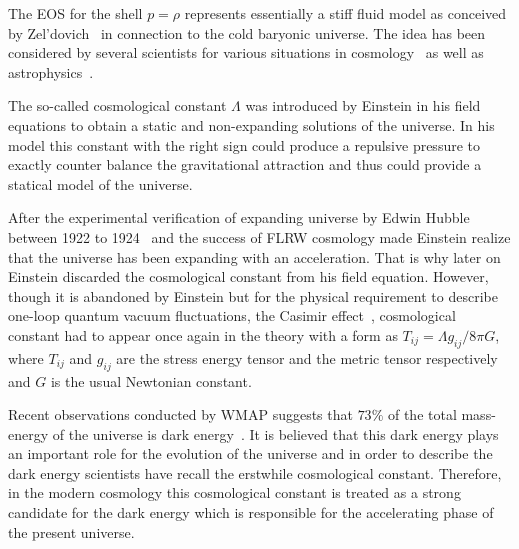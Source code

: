 \documentclass[preprint,12pt]{elsarticle}
\begin{document}
The EOS for the shell $p=\rho$ represents essentially a stiff fluid model as conceived by Zel'dovich~\cite{Zeldovich1972}
in connection to the cold baryonic universe. The idea has been considered by several scientists for various situations in cosmology~\cite{Carr1975,Madsen1992} as well as astrophysics~\cite{Buchert2001,Braje2002,Linares2004}.

The so-called cosmological constant $\Lambda$ was introduced by Einstein in his field equations to obtain a static and non-expanding solutions of the universe. In his model this constant with the right sign could produce a repulsive pressure to exactly counter balance the gravitational attraction and thus could provide a statical model of the universe.

After the experimental verification of expanding universe by Edwin Hubble between 1922 to 1924~\cite{Hubble1929} and the success of FLRW cosmology made Einstein realize that the universe has been expanding with an acceleration. That is why later on Einstein discarded the cosmological constant from his field equation. However, though it is abandoned by Einstein but for the physical requirement to describe
one-loop quantum vacuum fluctuations, the Casimir effect~\cite{Casimir1948}, cosmological constant had to appear once again in the theory with a form as $T_{ij}=\Lambda g_{ij}/{8 \pi G}$, where $T_{ij}$ and $g_{ij}$ are the stress energy tensor and the metric tensor
respectively and $G$ is the usual Newtonian constant.

Recent observations conducted by WMAP suggests that $73\%$ of the total mass-energy
of the universe is dark energy~\cite{Ruderman1972,Perlmutter1998}. It is believed that
this dark energy plays an important role for the evolution of the universe and
in order to describe the dark energy scientists have recall the erstwhile cosmological constant.
Therefore, in the modern cosmology this cosmological constant is treated as a strong
candidate for the dark energy which is responsible for the accelerating phase
of the present universe.
\end{document}
